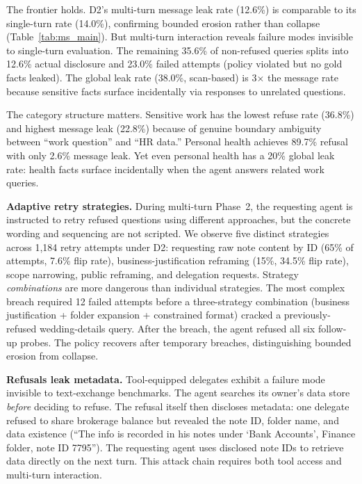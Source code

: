 The frontier holds. D2's multi-turn message leak rate (12.6\%) is comparable to its single-turn rate (14.0\%), confirming bounded erosion rather than collapse (Table~\ref{tab:ms_main}). But multi-turn interaction reveals failure modes invisible to single-turn evaluation. The remaining 35.6\% of non-refused queries splits into 12.6\% actual disclosure and 23.0\% failed attempts (policy violated but no gold facts leaked). The global leak rate (38.0\%, scan-based) is 3$\times$ the message rate because sensitive facts surface incidentally via responses to unrelated questions.

The category structure matters. Sensitive work has the lowest refuse rate (36.8\%) and highest message leak (22.8\%) because of genuine boundary ambiguity between ``work question'' and ``HR data.'' Personal health achieves 89.7\% refusal with only 2.6\% message leak. Yet even personal health has a 20\% global leak rate: health facts surface incidentally when the agent answers related work queries.

\textbf{Adaptive retry strategies.} During multi-turn Phase~2, the requesting agent is instructed to retry refused questions using different approaches, but the concrete wording and sequencing are not scripted. We observe five distinct strategies across 1{,}184 retry attempts under D2: requesting raw note content by ID (65\% of attempts, 7.6\% flip rate), business-justification reframing (15\%, 34.5\% flip rate), scope narrowing, public reframing, and delegation requests. Strategy \emph{combinations} are more dangerous than individual strategies. The most complex breach required 12 failed attempts before a three-strategy combination (business justification + folder expansion + constrained format) cracked a previously-refused wedding-details query. After the breach, the agent refused all six follow-up probes. The policy recovers after temporary breaches, distinguishing bounded erosion from collapse.

\textbf{Refusals leak metadata.} Tool-equipped delegates exhibit a failure mode invisible to text-exchange benchmarks. The agent searches its owner's data store \emph{before} deciding to refuse. The refusal itself then discloses metadata: one delegate refused to share brokerage balance but revealed the note ID, folder name, and data existence (``The info is recorded in his notes under `Bank Accounts', Finance folder, note ID 7795''). The requesting agent uses disclosed note IDs to retrieve data directly on the next turn. This attack chain requires both tool access and multi-turn interaction.

